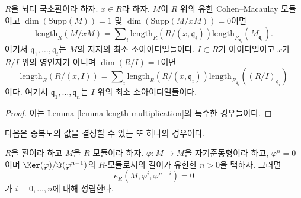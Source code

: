\begin{lemma}
\label{lemma-additivity-divisors-restricted}
$R$을 뇌터 국소환이라 하자. $x \in R$라 하자. $M$이 $R$ 위의 유한
Cohen--Macaulay 모듈이고 $\dim(\text{Supp}(M)) = 1$ 및
$\dim(\text{Supp}(M/xM)) = 0$이면
$$
\text{length}_R(M/xM)
=
\sum\nolimits_i \text{length}_R(R/(x, \mathfrak q_i))
\text{length}_{R_{\mathfrak q_i}}(M_{\mathfrak q_i}).
$$
여기서 $\mathfrak q_1, \ldots, \mathfrak q_t$는 $M$의 지지의 최소
소아이디얼들이다. $I \subset R$가 아이디얼이고 $x$가 $R/I$ 위의
영인자가 아니며 $\dim(R/I) = 1$이면
$$
\text{length}_R(R/(x, I))
=
\sum\nolimits_i \text{length}_R(R/(x, \mathfrak q_i))
\text{length}_{R_{\mathfrak q_i}}((R/I)_{\mathfrak q_i})
$$
이다. 여기서 $\mathfrak q_1, \ldots, \mathfrak q_n$는 $I$ 위의 최소
소아이디얼들이다.
\end{lemma}

\begin{proof}
이는 Lemma \ref{lemma-length-multiplication}의 특수한 경우들이다.
\end{proof}

\noindent
다음은 중복도의 값을 결정할 수 있는 또 하나의 경우이다.
\begin{lemma}
\label{lemma-powers-period-length-zero}
$R$을 환이라 하고 $M$을 $R$-모듈이라 하자. $\varphi : M \to M$을
자기준동형이라 하고, $\varphi^n = 0$이며
$\Ker(\varphi)/\Im(\varphi^{n - 1})$의 $R$-모듈로서의 길이가 유한한
$n > 0$을 택하자. 그러면
$$
e_R(M, \varphi^i, \varphi^{n - i}) = 0
$$
가 $i = 0, \ldots, n$에 대해 성립한다.
\end{lemma}

